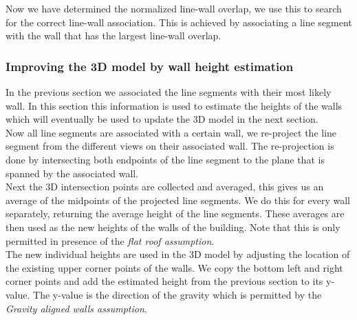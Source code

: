 	Now we have determined the normalized line-wall overlap, we use this to
	search for the correct line-wall association. This is achieved by
	associating a line segment with the wall that has the largest line-wall
	overlap.\\






\subsubsection{Improving the 3D model by wall height estimation}
	In the previous section we associated the line segments with their most
	likely wall. In this section this information is used to estimate the
	heights of the walls which will eventually be used to update the 3D model in the
	next section. \\
	Now all line segments are associated with a certain wall, we re-project the
	line segment from the different views on their associated wall. The
	re-projection is done by intersecting both endpoints of the line segment to
	the plane that is spanned by the associated wall.\\
	Next the 3D intersection points are collected and averaged, this gives us
	an average of the midpoints of the projected line segments. We do this for
	every wall separately, returning the average height of the line segments.
	These averages are then used as the new heights of the walls of the
	building. Note that this is only permitted in presence of the \emph{flat roof assumption}.\\
	The new individual heights are used in the 3D model by adjusting the
	location of the existing upper corner points of the walls. We copy the
	bottom left and right corner points and add the estimated height from the
	previous section to its y-value. The y-value is the direction of the
	gravity which is permitted by the \emph{Gravity aligned walls assumption}.

